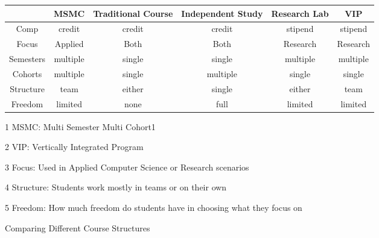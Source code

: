 \begin{figure*}[h!]
    \begin{threeparttable}[b]
    \caption{Comparing Different Course Structures}
    	\begin{tabulary}
            {0.95\linewidth}{C|CCCCC} 
            \toprule
             & MSMC & Traditional Course & Independent Study & Research Lab & VIP \\
            \midrule
            Comp & credit & credit & credit & stipend & stipend \\
            Focus & Applied & Both & Both & Research & Research \\
            Semesters & multiple & single & single & multiple & multiple \\
            Cohorts & multiple & single & multiple & single & single \\
            Structure & team & either & single & either & team \\
            Freedom & limited & none & full & limited & limited \\
            \bottomrule
    	\end{tabulary}
    	\begin{tablenotes}
    	    \item [1] MSMC: Multi Semester Multi Cohort1
    	    \item [2] VIP: Vertically Integrated Program
    	    \item [3] Focus: Used in Applied Computer Science or Research scenarios
    	    \item [4] Structure: Students work mostly in teams or on their own
    	    \item [5] Freedom: How much freedom do students have in choosing what they focus on
    	\end{tablenotes}
      	\label{fig:summary}
  	\end{threeparttable}        
\end{figure*}

